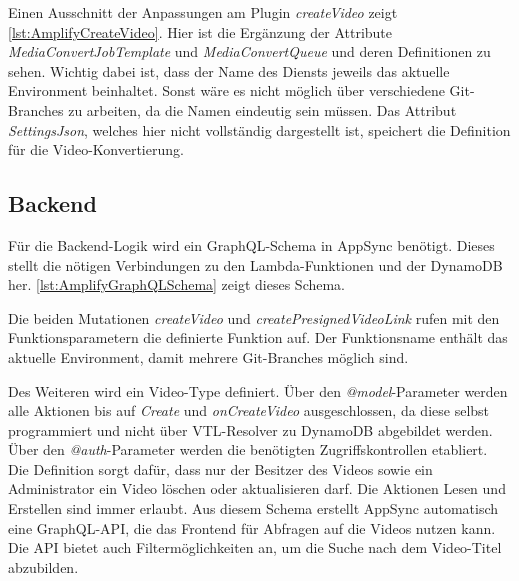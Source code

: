 Einen Ausschnitt der Anpassungen am Plugin \textit{createVideo} zeigt \autoref{lst:AmplifyCreateVideo}. Hier ist die Ergänzung der Attribute \textit{MediaConvertJobTemplate} und \textit{MediaConvertQueue} und deren Definitionen zu sehen. Wichtig dabei ist, dass der Name des Diensts jeweils das aktuelle Environment beinhaltet. Sonst wäre es nicht möglich über verschiedene Git-Branches zu arbeiten, da die Namen eindeutig sein müssen. Das Attribut \textit{SettingsJson}, welches hier nicht vollständig dargestellt ist, speichert die Definition für die Video-Konvertierung.



\subsection{Backend}

Für die Backend-Logik wird ein GraphQL-Schema in AppSync benötigt. Dieses stellt die nötigen Verbindungen zu den Lambda-Funktionen und der DynamoDB her. \autoref{lst:AmplifyGraphQLSchema} zeigt dieses Schema.

Die beiden Mutationen \textit{createVideo} und \textit{createPresignedVideoLink} rufen mit den Funktionsparametern die definierte Funktion auf. Der Funktionsname enthält das aktuelle Environment, damit mehrere Git-Branches möglich sind.

Des Weiteren wird ein Video-Type definiert. Über den \textit{@model}-Parameter werden alle Aktionen bis auf \textit{Create} und \textit{onCreateVideo} ausgeschlossen, da diese selbst programmiert und nicht über VTL-Resolver zu DynamoDB abgebildet werden. Über den \textit{@auth}-Parameter werden die benötigten Zugriffskontrollen etabliert. Die Definition sorgt dafür, dass nur der Besitzer des Videos sowie ein Administrator ein Video löschen oder aktualisieren darf. Die Aktionen Lesen und Erstellen sind immer erlaubt. Aus diesem Schema erstellt AppSync automatisch eine GraphQL-API, die das Frontend für Abfragen auf die Videos nutzen kann. Die API bietet auch Filtermöglichkeiten an, um die Suche nach dem Video-Titel abzubilden.



